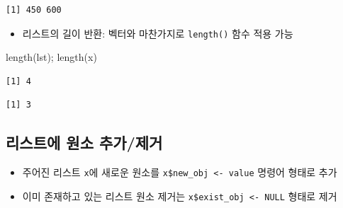 \documentclass[
  11pt,
]{krantz}
\newenvironment{Shaded}{\begin{snugshade}}{\end{snugshade}}
\newcommand{\CommentTok}[1]{\textcolor[rgb]{0.37,0.37,0.37}{\textit{#1}}}
\newcommand{\ConstantTok}[1]{\textcolor[rgb]{0,0,0}{#1}}
\newcommand{\DecValTok}[1]{\textcolor[rgb]{0.06,0.06,0.06}{#1}}
\newcommand{\FunctionTok}[1]{\textcolor[rgb]{0,0,0}{#1}}
\newcommand{\NormalTok}[1]{#1}
\newcommand{\OtherTok}[1]{\textcolor[rgb]{0.37,0.37,0.37}{#1}}
\newcommand{\SpecialCharTok}[1]{\textcolor[rgb]{0,0,0}{#1}}
\providecommand{\tightlist}{%
  \setlength{\itemsep}{0pt}\setlength{\parskip}{0pt}}
\begin{document}
\begin{verbatim}
[1] 450 600
\end{verbatim}

\normalsize

\begin{itemize}
\tightlist
\item
  리스트의 길이 반환: 벡터와 마찬가지로 \texttt{length()} 함수 적용 가능
\end{itemize}

\footnotesize

\begin{Shaded}
\begin{Highlighting}[]
\FunctionTok{length}\NormalTok{(lst); }\FunctionTok{length}\NormalTok{(x)}
\end{Highlighting}
\end{Shaded}

\begin{verbatim}
[1] 4
\end{verbatim}

\begin{verbatim}
[1] 3
\end{verbatim}

\normalsize

\hypertarget{list-add-delete}{%
\subsection{리스트에 원소 추가/제거}\label{list-add-delete}}

\begin{itemize}
\tightlist
\item
  주어진 리스트 \texttt{x}에 새로운 원소를 \texttt{x\$new\_obj\ \textless{}-\ value} 명령어 형태로 추가
\item
  이미 존재하고 있는 리스트 원소 제거는 \texttt{x\$exist\_obj\ \textless{}-\ NULL} 형태로 제거
\end{itemize}

\footnotesize

\begin{Shaded}
\end{Shaded}
\end{document}

